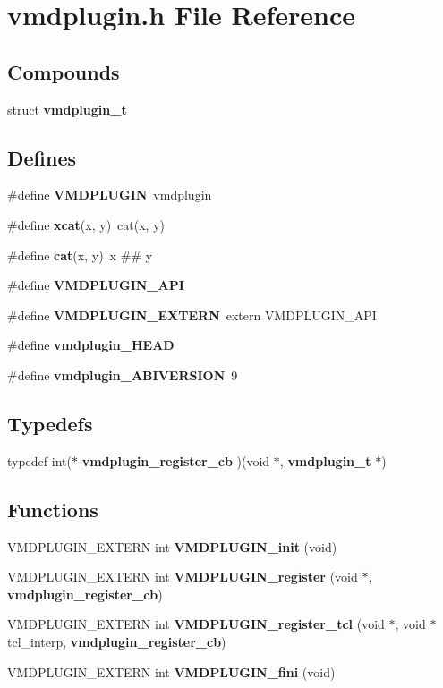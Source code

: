 \section{vmdplugin.h File Reference}
\label{vmdplugin_8h}
\subsection*{Compounds}
\begin{CompactItemize}
\item 
struct {\bf vmdplugin\_\-t}
\end{CompactItemize}
\subsection*{Defines}
\begin{CompactItemize}
\item 
\#define {\bf VMDPLUGIN}\ vmdplugin
\item 
\#define {\bf xcat}(x, y)\ cat(x, y)
\item 
\#define {\bf cat}(x, y)\ x \#\# y
\item 
\#define {\bf VMDPLUGIN\_\-API}
\item 
\#define {\bf VMDPLUGIN\_\-EXTERN}\ extern VMDPLUGIN\_\-API
\item 
\#define {\bf vmdplugin\_\-HEAD}
\item 
\#define {\bf vmdplugin\_\-ABIVERSION}\ 9
\end{CompactItemize}
\subsection*{Typedefs}
\begin{CompactItemize}
\item 
typedef int($\ast$ {\bf vmdplugin\_\-register\_\-cb} )(void $\ast$, {\bf vmdplugin\_\-t} $\ast$)
\end{CompactItemize}
\subsection*{Functions}
\begin{CompactItemize}
\item 
VMDPLUGIN\_\-EXTERN int {\bf VMDPLUGIN\_\-init} (void)
\item 
VMDPLUGIN\_\-EXTERN int {\bf VMDPLUGIN\_\-register} (void $\ast$, {\bf vmdplugin\_\-register\_\-cb})
\item 
VMDPLUGIN\_\-EXTERN int {\bf VMDPLUGIN\_\-register\_\-tcl} (void $\ast$, void $\ast$tcl\_\-interp, {\bf vmdplugin\_\-register\_\-cb})
\item 
VMDPLUGIN\_\-EXTERN int {\bf VMDPLUGIN\_\-fini} (void)
\end{CompactItemize}



